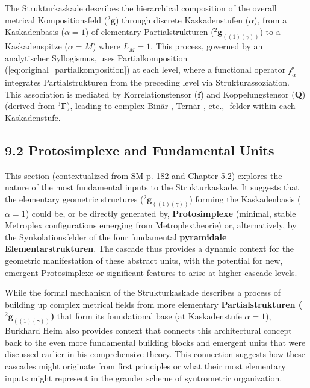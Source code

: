 \documentclass[12pt]{article}
\newcommand{\kompositionsfeld}{{}^2\mathbf{g}}
\newcommand{\partialstruktur}[1]{{}^2\mathbf{g}_{(#1)}} %
\newcommand{\fundamentalkondensor}{{}^3\bm{\Gamma}}
\newcommand{\korrelationstensor}{\mathbf{f}}
\newcommand{\koppelungstensor}{\mathbf{Q}}
\newcommand{\kaskadenstufe}{\alpha}
\begin{document}
The Strukturkaskade describes the hierarchical composition of the overall metrical Kompositionsfeld (\(\kompositionsfeld\)) through discrete Kaskadenstufen (\(\kaskadenstufe\)), from a Kaskadenbasis (\(\kaskadenstufe=1\)) of elementary Partialstrukturen (\(\partialstruktur{(1)(\gamma)}\)) to a Kaskadenspitze (\(\kaskadenstufe=M\)) where $L_M=1$. This process, governed by an analytischer Syllogismus, uses Partialkomposition (\eqref{eq:original_partialkomposition}) at each level, where a functional operator \(\mathcal{f}_\alpha\) integrates Partialstrukturen from the preceding level via Strukturassoziation. This association is mediated by Korrelationstensor (\(\korrelationstensor\)) and Koppelungstensor (\(\koppelungstensor\)) (derived from \(\fundamentalkondensor\)), leading to complex Binär-, Ternär-, etc., -felder within each Kaskadenstufe.

\subsection{9.2 Protosimplexe and Fundamental Units}
\label{sec:cascade_protosimplexe}

This section (contextualized from SM p. 182 and Chapter 5.2) explores the nature of the most fundamental inputs to the Strukturkaskade. It suggests that the elementary geometric structures (\(\partialstruktur{(1)(\gamma)}\)) forming the Kaskadenbasis (\(\kaskadenstufe=1\)) could be, or be directly generated by, \textbf{Protosimplexe} (minimal, stable Metroplex configurations emerging from Metroplextheorie) or, alternatively, by the Synkolationsfelder of the four fundamental \textbf{pyramidale Elementarstrukturen}. The cascade thus provides a dynamic context for the geometric manifestation of these abstract units, with the potential for new, emergent Protosimplexe or significant features to arise at higher cascade levels.

While the formal mechanism of the Strukturkaskade describes a process of building up complex metrical fields from more elementary \textbf{Partialstrukturen (\(\partialstruktur{(1)(\gamma)}\))} that form its foundational base (at Kaskadenstufe \( \kaskadenstufe=1 \)), Burkhard Heim also provides context that connects this architectural concept back to the even more fundamental building blocks and emergent units that were discussed earlier in his comprehensive theory. This connection suggests how these cascades might originate from first principles or what their most elementary inputs might represent in the grander scheme of syntrometric organization.
\end{document}
